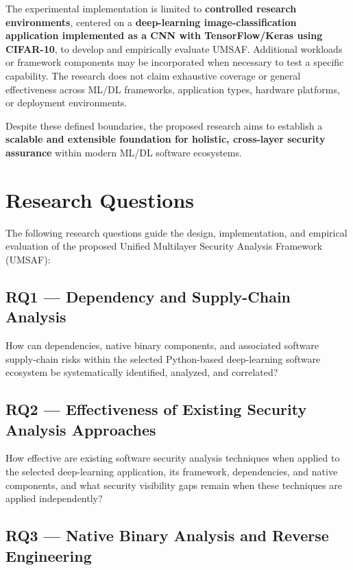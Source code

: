 \documentclass[
  12pt,
  letterpaper,
  oneside]{report}
\begin{document}
The experimental implementation is limited to \textbf{controlled
research environments}, centered on a \textbf{deep-learning
image-classification application implemented as a CNN with
TensorFlow/Keras using CIFAR-10}, to develop and empirically evaluate
UMSAF. Additional workloads or framework components may be incorporated
when necessary to test a specific capability. The research does not
claim exhaustive coverage or general effectiveness across ML/DL
frameworks, application types, hardware platforms, or deployment
environments.

Despite these defined boundaries, the proposed research aims to
establish a \textbf{scalable and extensible foundation for holistic,
cross-layer security assurance} within modern ML/DL software ecosystems.

\chapter{Research Questions}\label{5-research-questions}

The following research questions guide the design, implementation, and
empirical evaluation of the proposed Unified Multilayer Security
Analysis Framework (UMSAF):

\section{RQ1 --- Dependency and Supply-Chain
Analysis}\label{rq1--dependency-and-supply-chain-analysis}

How can dependencies, native binary components, and associated software
supply-chain risks within the selected Python-based deep-learning
software ecosystem be systematically identified, analyzed, and
correlated?

\section{RQ2 --- Effectiveness of Existing Security Analysis
Approaches}\label{rq2--effectiveness-of-existing-security-analysis-approaches}

How effective are existing software security analysis techniques when
applied to the selected deep-learning application, its framework,
dependencies, and native components, and what security visibility gaps
remain when these techniques are applied independently?

\section{RQ3 --- Native Binary Analysis and Reverse
Engineering}\label{rq3--native-binary-analysis-and-reverse-engineering}
\end{document}
